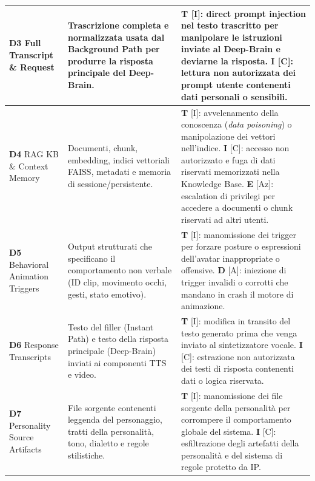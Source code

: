 \documentclass[11pt,a4paper]{article}
\begin{document}
\begin{longtable}{|C{2.8cm}|L{4.2cm}|L{\dimexpr\textwidth-2.8cm-4.2cm-6\arrayrulewidth\relax}|}
\textbf{D3} \newline Full Transcript \& Request & 
Trascrizione completa e normalizzata usata dal Background Path per produrre la risposta principale del Deep-Brain. & 
\textbf{T} [I]: direct prompt injection nel testo trascritto per manipolare le istruzioni inviate al Deep-Brain e deviarne la risposta. \newline \textbf{I} [C]: lettura non autorizzata dei prompt utente contenenti dati personali o sensibili. \\
\hline

\textbf{D4} \newline RAG KB \& Context Memory & 
Documenti, chunk, embedding, indici vettoriali FAISS, metadati e memoria di sessione/persistente. & 
\textbf{T} [I]: avvelenamento della conoscenza (\emph{data poisoning}) o manipolazione dei vettori nell'indice. \newline \textbf{I} [C]: accesso non autorizzato e fuga di dati riservati memorizzati nella Knowledge Base. \newline \textbf{E} [Az]: escalation di privilegi per accedere a documenti o chunk riservati ad altri utenti. \\
\hline

\textbf{D5} \newline Behavioral Animation Triggers & 
Output strutturati che specificano il comportamento non verbale (ID clip, movimento occhi, gesti, stato emotivo). & 
\textbf{T} [I]: manomissione dei trigger per forzare posture o espressioni dell'avatar inappropriate o offensive. \newline \textbf{D} [A]: iniezione di trigger invalidi o corrotti che mandano in crash il motore di animazione. \\
\hline

\textbf{D6} \newline Response Transcripts & 
Testo del filler (Instant Path) e testo della risposta principale (Deep-Brain) inviati ai componenti TTS e video. & 
\textbf{T} [I]: modifica in transito del testo generato prima che venga inviato al sintetizzatore vocale. \newline \textbf{I} [C]: estrazione non autorizzata dei testi di risposta contenenti dati o logica riservata. \\
\hline

\textbf{D7} \newline Personality Source Artifacts & 
File sorgente contenenti leggenda del personaggio, tratti della personalità, tono, dialetto e regole stilistiche. & 
\textbf{T} [I]: manomissione dei file sorgente della personalità per corrompere il comportamento globale del sistema. \newline \textbf{I} [C]: esfiltrazione degli artefatti della personalità e del sistema di regole protetto da IP. \\
\hline


\end{longtable}
\end{document}
